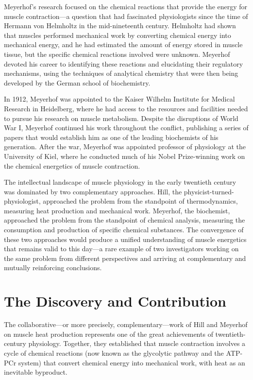 Meyerhof's research focused on the chemical reactions that provide the energy for muscle contraction---a question that had fascinated physiologists since the time of Hermann von Helmholtz in the mid-nineteenth century. Helmholtz had shown that muscles performed mechanical work by converting chemical energy into mechanical energy, and he had estimated the amount of energy stored in muscle tissue, but the specific chemical reactions involved were unknown. Meyerhof devoted his career to identifying these reactions and elucidating their regulatory mechanisms, using the techniques of analytical chemistry that were then being developed by the German school of biochemistry.

In 1912, Meyerhof was appointed to the Kaiser Wilhelm Institute for Medical Research in Heidelberg, where he had access to the resources and facilities needed to pursue his research on muscle metabolism. Despite the disruptions of World War I, Meyerhof continued his work throughout the conflict, publishing a series of papers that would establish him as one of the leading biochemists of his generation. After the war, Meyerhof was appointed professor of physiology at the University of Kiel, where he conducted much of his Nobel Prize-winning work on the chemical energetics of muscle contraction.

The intellectual landscape of muscle physiology in the early twentieth century was dominated by two complementary approaches. Hill, the physicist-turned-physiologist, approached the problem from the standpoint of thermodynamics, measuring heat production and mechanical work. Meyerhof, the biochemist, approached the problem from the standpoint of chemical analysis, measuring the consumption and production of specific chemical substances. The convergence of these two approaches would produce a unified understanding of muscle energetics that remains valid to this day---a rare example of two investigators working on the same problem from different perspectives and arriving at complementary and mutually reinforcing conclusions.

\section{The Discovery and Contribution}

The collaborative---or more precisely, complementary---work of Hill and Meyerhof on muscle heat production represents one of the great achievements of twentieth-century physiology. Together, they established that muscle contraction involves a cycle of chemical reactions (now known as the glycolytic pathway and the ATP-PCr system) that convert chemical energy into mechanical work, with heat as an inevitable byproduct.

